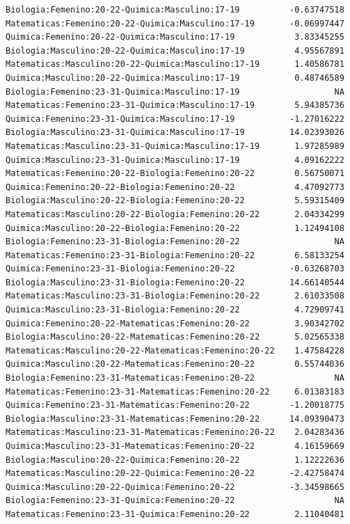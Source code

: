 \documentclass{rapport}
\begin{document}
\begin{itemize}
\begin{verbatim}
Biologia:Femenino:20-22-Quimica:Masculino:17-19          -0.63747518
Matematicas:Femenino:20-22-Quimica:Masculino:17-19       -0.06997447
Quimica:Femenino:20-22-Quimica:Masculino:17-19            3.83345255
Biologia:Masculino:20-22-Quimica:Masculino:17-19          4.95567891
Matematicas:Masculino:20-22-Quimica:Masculino:17-19       1.40586781
Quimica:Masculino:20-22-Quimica:Masculino:17-19           0.48746589
Biologia:Femenino:23-31-Quimica:Masculino:17-19                   NA
Matematicas:Femenino:23-31-Quimica:Masculino:17-19        5.94385736
Quimica:Femenino:23-31-Quimica:Masculino:17-19           -1.27016222
Biologia:Masculino:23-31-Quimica:Masculino:17-19         14.02393026
Matematicas:Masculino:23-31-Quimica:Masculino:17-19       1.97285989
Quimica:Masculino:23-31-Quimica:Masculino:17-19           4.09162222
Matematicas:Femenino:20-22-Biologia:Femenino:20-22        0.56750071
Quimica:Femenino:20-22-Biologia:Femenino:20-22            4.47092773
Biologia:Masculino:20-22-Biologia:Femenino:20-22          5.59315409
Matematicas:Masculino:20-22-Biologia:Femenino:20-22       2.04334299
Quimica:Masculino:20-22-Biologia:Femenino:20-22           1.12494108
Biologia:Femenino:23-31-Biologia:Femenino:20-22                   NA
Matematicas:Femenino:23-31-Biologia:Femenino:20-22        6.58133254
Quimica:Femenino:23-31-Biologia:Femenino:20-22           -0.63268703
Biologia:Masculino:23-31-Biologia:Femenino:20-22         14.66140544
Matematicas:Masculino:23-31-Biologia:Femenino:20-22       2.61033508
Quimica:Masculino:23-31-Biologia:Femenino:20-22           4.72909741
Quimica:Femenino:20-22-Matematicas:Femenino:20-22         3.90342702
Biologia:Masculino:20-22-Matematicas:Femenino:20-22       5.02565338
Matematicas:Masculino:20-22-Matematicas:Femenino:20-22    1.47584228
Quimica:Masculino:20-22-Matematicas:Femenino:20-22        0.55744036
Biologia:Femenino:23-31-Matematicas:Femenino:20-22                NA
Matematicas:Femenino:23-31-Matematicas:Femenino:20-22     6.01383183
Quimica:Femenino:23-31-Matematicas:Femenino:20-22        -1.20018775
Biologia:Masculino:23-31-Matematicas:Femenino:20-22      14.09390473
Matematicas:Masculino:23-31-Matematicas:Femenino:20-22    2.04283436
Quimica:Masculino:23-31-Matematicas:Femenino:20-22        4.16159669
Biologia:Masculino:20-22-Quimica:Femenino:20-22           1.12222636
Matematicas:Masculino:20-22-Quimica:Femenino:20-22       -2.42758474
Quimica:Masculino:20-22-Quimica:Femenino:20-22           -3.34598665
Biologia:Femenino:23-31-Quimica:Femenino:20-22                    NA
Matematicas:Femenino:23-31-Quimica:Femenino:20-22         2.11040481

\end{verbatim}
\end{itemize}
\end{document}
